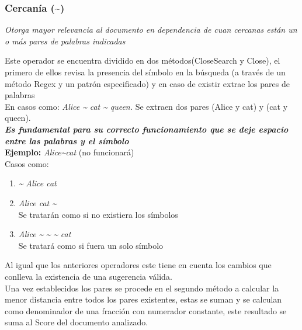 \documentclass[options]{article}
\begin{document}
\subsubsection{Cercanía (\textasciitilde)}
\begin{center}
    \textit{Otorga mayor relevancia al documento en dependencia de cuan cercanas están un o más pares de palabras indicadas}
\end{center}
Este operador se encuentra dividido en dos métodos(CloseSearch y Close), el primero de ellos revisa la presencia del símbolo en la búsqueda (a través de un método Regex y un patrón especificado) y en caso de existir extrae los pares de palabras\\
En casos como: \textit{Alice \textasciitilde} \textit{cat \textasciitilde} \textit{queen.}  Se extraen dos pares (Alice y cat) y (cat y queen).\\
\textbf{\textit{Es fundamental para su correcto funcionamiento que se deje espacio entre las palabras y el símbolo}}\\
\textbf{Ejemplo: }\textit{Alice\textasciitilde cat} (no funcionará)\\
Casos como:\\
\begin{enumerate}
    \item \textit{\textasciitilde} \textit{Alice cat}
    \item \textit{Alice cat} \textit{\textasciitilde}\\
    Se tratarán como si no existiera los símbolos
    \item \textit{Alice }\textit{\textasciitilde} \textit{\textasciitilde} \textit{\textasciitilde} \textit{cat}\\
    Se tratará como si fuera un solo símbolo
\end{enumerate}
Al igual que los anteriores operadores este tiene en cuenta los cambios que conlleva la existencia de una sugerencia válida.\\
Una vez establecidos los pares se procede en el segundo método a calcular la menor distancia entre todos los pares existentes, estas se suman y se calculan como denominador de una fracción con numerador constante, este resultado se suma al Score del documento analizado.
\end{document}
